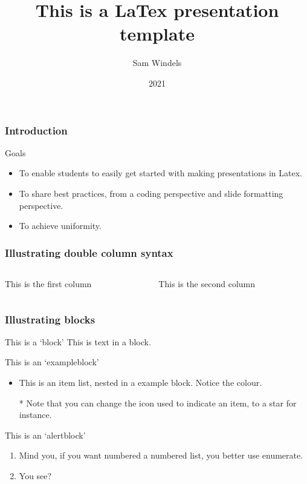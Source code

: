 \documentclass[aspectratio=169]{beamer} %
\title{This is a LaTex presentation template }
\author{Sam Windels}
\institute{Barcelona Supercomputing Centre}
\date{2021}
\begin{document}
\frame{\titlepage}

\begin{frame}
\frametitle{Introduction}

\begin{block}{Goals}
	\begin{itemize}
		\item To enable students to easily get started with making presentations in Latex.
		\item To share best practices, from a coding perspective and slide formatting perspective.
		\item To achieve uniformity.
	\end{itemize} 
\end{block}

\end{frame}

\begin{frame}[t]
	\frametitle{Illustrating double column syntax}
	\begin{columns}
		\begin{column}{0.5\textwidth}
			This is the first column
		\end{column}
		\begin{column}{0.5\textwidth}
			This is the second column
		\end{column}
	\end{columns}
\end{frame}

\begin{frame}[t]
	\frametitle{Illustrating blocks}

	\begin{block}{This is a `block'}
		This is text in a block.
	\end{block}

	\begin{exampleblock}{This is an `exampleblock'}
		\begin{itemize}
			\item This is an item list, nested in a example block. Notice the colour.
			\item[*] Note that you can change the icon used to indicate an item, to a star for instance.
		\end{itemize}		
	\end{exampleblock}
	
	\begin{alertblock}{This is an `alertblock'}
		\begin{enumerate}
			\item Mind you, if you want numbered a numbered list, you better use enumerate.
			\item You see?
		\end{enumerate}
	\end{alertblock}
	
\end{frame}
\end{document}
